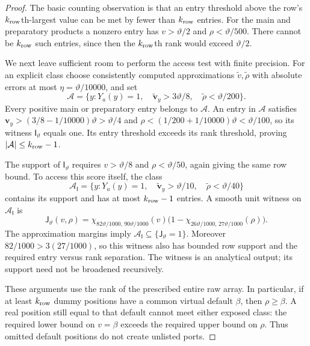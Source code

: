 \documentclass[11pt]{article}
\numberwithin{equation}{section}
\theoremstyle{definition}
\theoremstyle{remark}
\begin{document}
\begin{proof}
The basic counting observation is that an entry threshold above the row's ${k_{\rm row}}$th-largest value can be met by fewer than ${k_{\rm row}}$ entries. For the main and preparatory products a nonzero entry has
$v>\vartheta/2$ and $\rho<\vartheta/500$.  There cannot be ${k_{\rm row}}$ such
entries, since then the ${k_{\rm row}}$th rank would exceed $\vartheta/2$.

We next leave sufficient room to perform the access test with finite precision. For an explicit class choose consistently computed approximations
$\widetilde v,\widetilde\rho$ with absolute errors at most
$\eta=\vartheta/10000$, and set
\begin{equation}
 {\mathcal{A}}=\{y:Y_a(y)=1,\quad
       \widetilde {\mathbf{v}}_y>3\vartheta/8,\quad
       \widetilde\rho<\vartheta/200\}.
 \label{eq:atom-exposed-class}
\end{equation}
Every positive main or preparatory entry belongs to ${\mathcal{A}}$.  An entry in
${\mathcal{A}}$ satisfies ${\mathbf{v}}_y>(3/8-1/10000)\vartheta>\vartheta/4$ and
$\rho<(1/200+1/10000)\vartheta<\vartheta/100$, so its witness
${\mathsf{I}}_{\vartheta}$ equals one.  Its entry threshold exceeds its rank
threshold, proving $|{\mathcal{A}}|\le {k_{\rm row}}-1$.

The support of ${\mathsf{I}}_{\vartheta}$ requires $v>\vartheta/8$ and
$\rho<\vartheta/50$, again giving the same row bound.  To access this
score itself, the class
\[
 {\mathcal{A}}_{\mathsf{I}}=\{y:Y_a(y)=1,\quad
       \widetilde {\mathbf{v}}_y>\vartheta/10,\quad
       \widetilde\rho<\vartheta/40\}
\]
contains its support and has at most ${k_{\rm row}}-1$ entries.  A smooth unit witness
on ${\mathcal{A}}_{\mathsf{I}}$ is
\[
 {\mathsf{J}}_{\vartheta}(v,\rho)=
  \chi_{82\vartheta/1000,\,90\vartheta/1000}(v)
  \bigl(1-\chi_{26\vartheta/1000,\,27\vartheta/1000}(\rho)\bigr).
\]
The approximation margins imply ${\mathcal{A}}_{\mathsf{I}}\subseteq\{{\mathsf{J}}_{\vartheta}=1\}$.
Moreover $82/1000>3(27/1000)$, so this witness also has bounded row
support and the required entry versus rank separation.  The witness is
an analytical output; its support need not be broadened recursively.

These arguments use the rank of the prescribed entire raw array.
In particular, if at least ${k_{\rm row}}$ dummy positions have a common virtual
default $\beta$, then $\rho\ge\beta$.  A real position still equal to
that default cannot meet either exposed class: the required lower bound
on $v=\beta$ exceeds the required upper bound on $\rho$.  Thus omitted
default positions do not create unlisted ports.
\end{proof}
\end{document}
